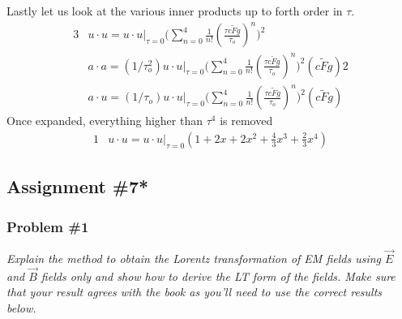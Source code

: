 \documentclass[]{article}
\numberwithin{equation}{subsection}
\begin{document}
Lastly let us look at the various inner products up to forth order in $\tau$.
\begin{alignat}{3}
	\label{f28}	&u\cdot u=u\cdot u|_{\tau=0}\Big(\sum_{n=0}^{4}\frac{1}{n!}(\frac{\tau c\tilde{F}g}{\tau_{o}})^{n}\Big)^{2}\\
	\label{f29}	&a\cdot a=(1/\tau_{o}^{2})u\cdot u|_{\tau=0}\Big(\sum_{n=0}^{4}\frac{1}{n!}(\frac{\tau c\tilde{F}g}{\tau_{o}})^{n}\Big)^{2}(c\tilde{F}g){2}\\
	\label{f30}	&a\cdot u=(1/\tau_{o})u\cdot u|_{\tau=0}\Big(\sum_{n=0}^{4}\frac{1}{n!}(\frac{\tau c\tilde{F}g}{\tau_{o}})^{n}\Big)^{2}(c\tilde{F}g)
\end{alignat}
	Once expanded, everything higher than $\tau^{4}$ is removed
\begin{alignat}{1}
	\label{f31}	&u\cdot u=u\cdot u|_{\tau=0}(1+2x+2x^{2}+\frac{4}{3}x^{3}+\frac{2}{3}x^{4})
\end{alignat}
\subsection{Assignment \#7*}
\subsubsection*{Problem \#1}
\emph{Explain the method to obtain the Lorentz transformation of EM fields using $\vec{E}$ and $\vec{B}$ fields only and show how to derive the LT form of the fields. Make sure that your result agrees with the book as you'll need to use the correct results below.}\\
\end{document}
